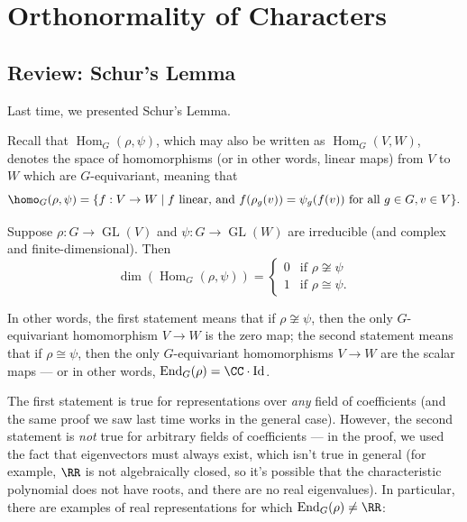 

\section{Orthonormality of Characters}

\subsection{Review: Schur's Lemma}

Last time, we presented Schur's Lemma.

Recall that $\operatorname{Hom}_G(\rho, \psi)$, which may also be written as $\operatorname{Hom}_G(V, W)$, denotes the space of homomorphisms (or in other words, linear maps) from $V$ to $W$ which are $G$-equivariant, meaning that \[\homo_G(\rho, \psi) = \{f : V \to W \mid f \text{ linear, and } f(\rho_g(v)) = \psi_g(f(v)) \text{ for all } g \in G, v \in V\}.\]

\begin{theorem}
Suppose $\rho: G \to \operatorname{GL}(V)$ and $\psi: G \to \operatorname{GL}(W)$ are irreducible (and complex and finite-dimensional). Then \[\dim\left(\operatorname{Hom}_G(\rho, \psi)\right) = \begin{cases} 0 & \text{if } \rho \not\cong \psi \\ 1 & \text{if } \rho \cong \psi.\end{cases}\] 
\end{theorem}

In other words, the first statement means that if $\rho \not\cong \psi$, then the only $G$-equivariant homomorphism $V \to W$ is the zero map; the second statement means that if $\rho \cong \psi$, then the only $G$-equivariant homomorphisms $V \to W$ are the scalar maps --- or in other words, $\operatorname{End}_G(\rho) = \CC\cdot \operatorname{Id}$. 

The first statement is true for representations over \emph{any} field of coefficients (and the same proof we saw last time works in the general case). However, the second statement is \emph{not} true for arbitrary fields of coefficients --- in the proof, we used the fact that eigenvectors must always exist, which isn't true in general (for example, $\RR$ is not algebraically closed, so it's possible that the characteristic polynomial does not have roots, and there are no real eigenvalues). In particular, there are examples of real representations for which $\operatorname{End}_G(\rho) \neq \RR$:

